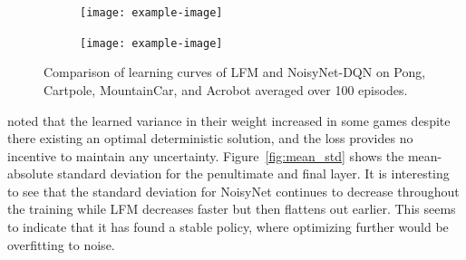 \documentclass[]{uai2022} %
\begin{document}
\begin{figure}
\begin{subfigure}[b]{0.45\columnwidth}
    \end{subfigure}
    \begin{subfigure}[b]{0.45\columnwidth}
        \centering
        \texttt{[image: example-image]}
    \end{subfigure}
    \begin{subfigure}[b]{0.45\columnwidth}
        \centering
        \texttt{[image: example-image]}
    \end{subfigure}
    \caption{Comparison of learning curves of LFM and NoisyNet-DQN on
    Pong, Cartpole, MountainCar, and Acrobot averaged over 100 episodes.}
    \label{fig:training_curves}
\end{figure}

\cite{fortunato_noisy_2019} noted that the learned variance in their weight increased
in some games despite there existing an optimal deterministic solution, and the loss
provides no incentive to maintain any uncertainty. Figure~\ref{fig:mean_std} shows
the mean-absolute standard deviation for the penultimate and final layer. It is 
interesting to see that the standard deviation for NoisyNet continues to decrease
throughout the training while LFM decreases faster but then flattens out earlier.
This seems to indicate that it has found a stable policy, where optimizing further would
be overfitting to noise.
\end{document}
